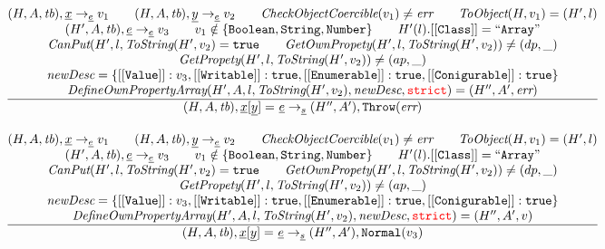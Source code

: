 \[\begin{array}{l@{~~}l@{~~}ll}
\frac{\begin{matrix}
\evale, \irid \rightarrow_{\ir\expr} v_1
\rulesep
\evale, \ir{y} \rightarrow_{\ir\expr} v_2
\rulesep
\hf{CheckObjectCoercible}(v_1) \not= \err
\rulesep
\hf{ToObject}(H, v_1) = (H',l)
\\
(H', A, \tb), \irexpr \rightarrow_{\ir\expr} v_3
\rulesep
v_1 \notin \{{\tt Boolean, String, Number}\}
\rulesep
H'(l).[[{\tt Class}]] = {\tt``Array"}%
\\
\hf{CanPut}(H', l, \hf{ToString}(H', v_2) = \true
\rulesep
\hf{GetOwnPropety}(H', l,\hf{ToString}(H', v_2)) \not= (dp, \_)
\\
\hf{GetPropety}(H', l,\hf{ToString}(H', v_2)) \not= (ap, \_)
\\
\hf{newDesc} = \{[[{\tt Value}]]:v_3, {\tt[[Writable]]}:\true,  [[{\tt Enumerable}]]:\true,  [[{\tt Conigurable}]]:\true \}
\\
\hf{DefineOwnPropertyArray}(H', A, l, \hf{ToString}(H', v_2), \hf{newDesc}, \strict) = (H'', A', \err)
\end{matrix}}{\begin{matrix}
\state, \irid{\tt[}\ir{y}{\tt] =} \ \irexpr \rightarrow_{\ir\stmt}
(H'',A'), {\tt Throw}(\err)
\end{matrix}}
\\[2em]


\frac{\begin{matrix}
\evale, \irid \rightarrow_{\ir\expr} v_1
\rulesep
\evale, \ir{y} \rightarrow_{\ir\expr} v_2
\rulesep
\hf{CheckObjectCoercible}(v_1) \not= \err
\rulesep
\hf{ToObject}(H, v_1) = (H',l)
\\
(H', A, \tb), \irexpr \rightarrow_{\ir\expr} v_3
\rulesep
v_1 \notin \{{\tt Boolean, String, Number}\}
\rulesep
H'(l).[[{\tt Class}]] = {\tt``Array"}%
\\
\hf{CanPut}(H', l, \hf{ToString}(H', v_2) = \true
\rulesep
\hf{GetOwnPropety}(H', l,\hf{ToString}(H', v_2)) \not= (dp, \_)
\\
\hf{GetPropety}(H', l,\hf{ToString}(H', v_2)) \not= (ap, \_)
\\
\hf{newDesc} = \{[[{\tt Value}]]:v_3, {\tt[[Writable]]}:\true,  [[{\tt Enumerable}]]:\true,  [[{\tt Conigurable}]]:\true \}
\\
\hf{DefineOwnPropertyArray}(H', A, l, \hf{ToString}(H', v_2), \hf{newDesc}, \strict) = (H'', A', v)
\end{matrix}}{\begin{matrix}
\state, \irid{\tt[}\ir{y}{\tt] =} \ \irexpr \rightarrow_{\ir\stmt}
(H'',A'), {\tt Normal}(v_3)
\end{matrix}}
\\[2em]




\end{array}\]
